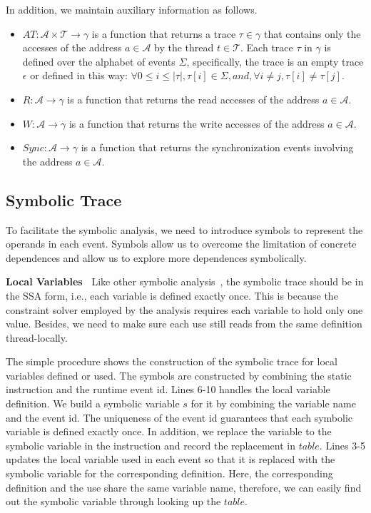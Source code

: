 
In addition, we maintain auxiliary information as follows.
\begin{itemize}
\item $AT: \mathcal{A} \times \mathcal{T} \rightarrow \gamma$ is a function that returns a trace $\tau \in \gamma$ that contains only the accesses of the address $a \in \mathcal{A}$ by the thread $t\in \mathcal{T}$. Each trace $\tau$ in $\gamma$ is defined over the alphabet of events $\Sigma$, specifically, the trace is an empty trace $\epsilon$ or defined in this way:  $\forall 0\leq i\leq |\tau|,   \tau[i]\in \Sigma, and, \forall i\neq j, \tau[i]\neq \tau[j]$. 
\item $R: \mathcal{A} \rightarrow \gamma$ is a function that returns the read accesses of the address $a\in \mathcal{A}$.
\item $W: \mathcal{A} \rightarrow \gamma$ is a function that returns the write accesses of the address $a \in \mathcal{A}$.
\item $Sync: \mathcal{A} \rightarrow \gamma$ is a function that returns the synchronization events involving the address $a\in \mathcal{A}$. 
\end{itemize}


\subsection{Symbolic Trace}
To facilitate the symbolic analysis, we need to introduce symbols to represent the operands in each event. Symbols allow us to overcome the limitation of concrete dependences and allow us to explore more dependences symbolically. 





{\bf Local Variables\  }
Like other symbolic analysis~\cite{jeff,chao}, the symbolic trace should be in the SSA form, i.e., each variable is defined exactly once. This is because the constraint solver employed by the analysis requires each variable to hold only one value. Besides, we need to make sure each use still reads from the same definition thread-locally. 

The  simple procedure shows the construction of the symbolic trace for local variables defined or used. The symbols are constructed by combining the static instruction and the runtime event id. Lines 6-10 handles the local variable definition.  We build a symbolic variable $s$ for it by combining the variable name and the event id. The uniqueness of the event id guarantees that each symbolic variable is defined exactly once. In addition, we replace the variable to the symbolic variable in the instruction and record the replacement in $table$. Lines 3-5 updates the local variable used in each event so that it is replaced with the symbolic variable for the corresponding definition. Here, the corresponding definition and the use share the same variable name, therefore, we can easily find out the symbolic variable through looking up the $table$. 

